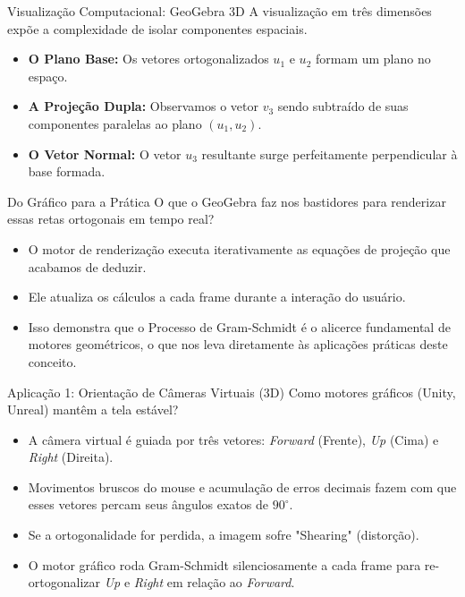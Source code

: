 \documentclass{beamer}
\begin{document}
\begin{frame}{Visualização Computacional: GeoGebra 3D}
A visualização em três dimensões expõe a complexidade de isolar componentes espaciais.
\vspace{0.3cm}
\begin{itemize}
    \item \textbf{O Plano Base:} Os vetores ortogonalizados $u_1$ e $u_2$ formam um plano no espaço.
    \item \textbf{A Projeção Dupla:} Observamos o vetor $v_3$ sendo subtraído de suas componentes paralelas ao plano $(u_1, u_2)$.
    \item \textbf{O Vetor Normal:} O vetor $u_3$ resultante surge perfeitamente perpendicular à base formada.
\end{itemize}
\vspace{0.5cm}
\end{frame}

\begin{frame}{Do Gráfico para a Prática}
O que o GeoGebra faz nos bastidores para renderizar essas retas ortogonais em tempo real?
\vspace{0.3cm}
\begin{itemize}
    \item O motor de renderização executa iterativamente as equações de projeção que acabamos de deduzir.
    \item Ele atualiza os cálculos a cada frame durante a interação do usuário.
    \item Isso demonstra que o Processo de Gram-Schmidt é o alicerce fundamental de motores geométricos, o que nos leva diretamente às aplicações práticas deste conceito.
\end{itemize}
\end{frame}


\begin{frame}{Aplicação 1: Orientação de Câmeras Virtuais (3D)}
Como motores gráficos (Unity, Unreal) mantêm a tela estável?
\vspace{0.3cm}
\begin{itemize}
    \item A câmera virtual é guiada por três vetores: \textit{Forward} (Frente), \textit{Up} (Cima) e \textit{Right} (Direita).
    \item Movimentos bruscos do mouse e acumulação de erros decimais fazem com que esses vetores percam seus ângulos exatos de $90^\circ$.
    \item Se a ortogonalidade for perdida, a imagem sofre "Shearing" (distorção). 
    \item O motor gráfico roda Gram-Schmidt silenciosamente a cada frame para re-ortogonalizar \textit{Up} e \textit{Right} em relação ao \textit{Forward}.
\end{itemize}
\end{frame}
\end{document}
